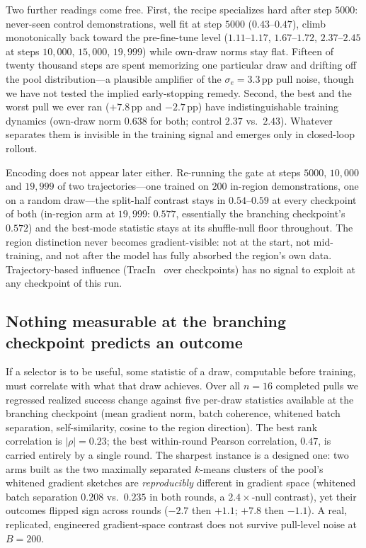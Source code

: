 Two further readings come free. First, the recipe specializes hard after step
$5000$: never-seen control demonstrations, well fit at step $5000$
($0.43$--$0.47$), climb monotonically back toward the pre-fine-tune level
($1.11$--$1.17$, $1.67$--$1.72$, $2.37$--$2.45$ at steps $10{,}000$, $15{,}000$,
$19{,}999$) while own-draw norms stay flat. Fifteen of twenty thousand steps are
spent memorizing one particular draw and drifting off the pool distribution---a
plausible amplifier of the $\sigma_e{=}3.3$\,pp pull noise, though we have not
tested the implied early-stopping remedy. Second, the best and the worst pull we
ever ran ($+7.8$\,pp and $-2.7$\,pp) have indistinguishable training dynamics
(own-draw norm $0.638$ for both; control $2.37$ vs.\ $2.43$). Whatever separates
them is invisible in the training signal and emerges only in closed-loop
rollout.

Encoding does not appear later either. Re-running the gate at steps $5000$,
$10{,}000$ and $19{,}999$ of two trajectories---one trained on $200$ in-region
demonstrations, one on a random draw---the split-half contrast stays in
$0.54$--$0.59$ at every checkpoint of both (in-region arm at $19{,}999$: $0.577$,
essentially the branching checkpoint's $0.572$) and the best-mode statistic
stays at its shuffle-null floor throughout. The region distinction never becomes
gradient-visible: not at the start, not mid-training, and not after the model
has fully absorbed the region's own data. Trajectory-based influence
(TracIn~\cite{tracin} over checkpoints) has no signal to exploit at any
checkpoint of this run.

\subsection{Nothing measurable at the branching checkpoint predicts an outcome}
\label{sec:grad_q3}
If a selector is to be useful, some statistic of a draw, computable before
training, must correlate with what that draw achieves. Over all $n{=}16$
completed pulls we regressed realized success change against five
per-draw statistics available at the branching checkpoint (mean gradient norm,
batch coherence, whitened batch separation, self-similarity, cosine to the
region direction). The best rank correlation is $|\rho|{=}0.23$; the best
within-round Pearson correlation, $0.47$, is carried entirely by a single
round. The sharpest instance is a designed one: two arms built as the two
maximally separated $k$-means clusters of the pool's whitened gradient sketches
are \emph{reproducibly} different in gradient space (whitened batch separation
$0.208$ vs.\ $0.235$ in both rounds, a $2.4\times$-null contrast), yet their
outcomes flipped sign across rounds ($-2.7$ then $+1.1$; $+7.8$ then $-1.1$).
A real, replicated, engineered gradient-space contrast does not survive
pull-level noise at $B{=}200$.

